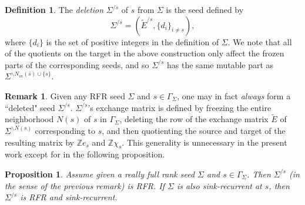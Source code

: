 \documentclass[11pt]{amsart}
\newtheorem{prop}[thm]{Proposition}
\theoremstyle{definition}
\newtheorem{defn}[thm]{Definition}
\newtheorem{rem}[thm]{Remark}
\theoremstyle{remark}
\numberwithin{equation}{section}
\begin{document}
\begin{defn}
     The \textit{deletion} $\Sigma^{/s}$ of $s$ from $\Sigma$ is the seed defined by \begin{equation}
         \Sigma^{/s} = (\tilde{E}^{/s}, \{d_i\}_{i \neq s}),
     \end{equation} where $\{d_i\}$ is the set of positive integers in the definition of $\Sigma$. We note that all of the quotients on the target in the above construction only affect the frozen parts of the corresponding seeds, and so $\Sigma^{/s}$ has the same mutable part as $\Sigma^{\backslash N_{in}(s) \cup \{s\}}$.
\end{defn}

\begin{rem}
    Given any RFR seed $\Sigma$ and $s \in \Gamma_\Sigma$, one may in fact \textit{always} form a ``deleted" seed $\Sigma^{/s}$. $\Sigma^{/s}$'s exchange matrix is defined by freezing the entire neighborhood $N(s)$ of $s$ in $\Gamma_\Sigma$, deleting the row of the exchange matrix $\tilde{E}$ of $\Sigma^{\backslash N(s)}$ corresponding to $s$, and then quotienting the source and target of the resulting matrix by $\mathbb{Z}e_s$ and $\mathbb{Z}\chi_s$. This generality is unnecessary in the present work except for in the following proposition.
\end{rem}

\begin{prop}\label{still rfr}
    Assume given a really full rank seed $\Sigma$ and $s \in \Gamma_\Sigma$. Then $\Sigma^{/s}$ (in the sense of the previous remark) is RFR. If $\Sigma$ is also sink-recurrent at $s$, then $\Sigma^{/s}$ is RFR and sink-recurrent.
\end{prop}
\end{document}
